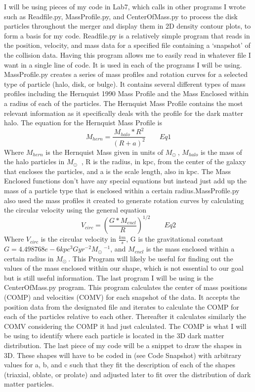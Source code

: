 \documentclass{aastex63}
\begin{document}
I will be using pieces of my code in Lab7, which calls in other programs I wrote such as Readfile.py, MassProfile.py, and CenterOfMass.py to process the disk particles throughout the merger and display them in 2D density contour plots, to form a basis for my code. Readfile.py is a relatively simple program that reads in the position, velocity, and mass data for a specified file containing a ‘snapshot’ of the collision data. Having this program allows me to easily read in whatever file I want in a single line of code. It is used in each of the programs I will be using. MassProfile.py creates a series of mass profiles and rotation curves for a selected type of particle (halo, disk, or bulge). It contains several different types of mass profiles including the Hernquist 1990 Mass Profile and the Mass Enclosed within a radius of each of the particles. The Hernquist Mass Profile contains the most relevant information as it specifically deals with the profile for the dark matter halo. The equation for the Hernquist Mass Profile is \[M_{hern}= \frac{M_{halo}*R^2}{(R+a)^2}\qquad Eq1\]
Where $M_{hern}$ is the Hernquist Mass given in units of $M_\odot\ $, $M_{halo}$ is the mass of the halo particles in $M_\odot\ $ , R is the radius, in \si{kpc}, from the center of the galaxy that encloses the particles, and a is the scale length, also in \si{kpc}. The Mass Enclosed functions don’t have any special equations but instead just add up the mass of a particle type that is enclosed within a certain radius.MassProfile.py also used the mass profiles it created to generate rotation curves by calculating the circular velocity using the general equation \[V_{circ}= (\frac{G*M_{encl}}{R})^{1/2}\qquad Eq2\]
Where $V_{circ}$ is the circular velocity in $\frac{km}{s}$, G is the gravitational constant $G=4.498768e-6 kpc^3Gyr^{-2}M_\odot\ ^{-1}$, and $M_{encl}$ is the mass enclosed within a certain radius in $M_\odot\ $. This Program will likely be useful for finding out the values of the mass enclosed within our shape, which is not essential to our goal but is still useful information. 
The last program I will be using is the CenterOfMass.py program. This program calculates the center of mass positions (COMP) and velocities (COMV) for each snapshot of the data. It accepts the position data from the designated file and iterates to calculate the COMP for each of the particles relative to each other. Thereafter it calculates similarly the COMV considering the COMP it had just calculated. The COMP is what I will be using to identify where each particle is located in the 3D dark matter distribution. The last piece of my code will be a snippet to draw the shapes in 3D. These shapes will have to be coded in (see Code Snapshot) with arbitrary values for a, b, and c such that they fit the description of each of the shapes (triaxial, oblate, or prolate) and adjusted later to fit over the distribution of dark matter particles.
\end{document}
